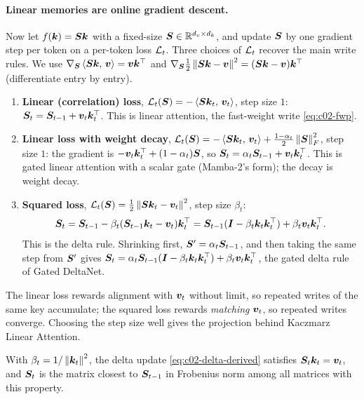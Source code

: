 \paragraph{Linear memories are online gradient descent.} Now let $f(\bm{k}) = \bm{S}\bm{k}$ with a fixed-size
$\bm{S}\in\mathbb{R}^{d_v\times d_k}$, and update $\bm{S}$ by one gradient step per token on a per-token loss
$\mathcal{L}_t$. Three choices of $\mathcal{L}_t$ recover the main write rules. We use
$\nabla_{\bm{S}}\left\langle \bm{S}\bm{k},\, \bm{v}\right\rangle = \bm{v}\bm{k}^{\top}$ and
$\nabla_{\bm{S}}\tfrac12\left\lVert \bm{S}\bm{k} - \bm{v}\right\rVert^2 = (\bm{S}\bm{k} - \bm{v})\bm{k}^{\top}$ (differentiate entry by entry).
\begin{enumerate}
  \item \textbf{Linear (correlation) loss}, $\mathcal{L}_t(\bm{S}) = -\left\langle \bm{S}\bm{k}_t,\, \bm{v}_t\right\rangle$, step size
        $1$: $\bm{S}_t = \bm{S}_{t-1} + \bm{v}_t\bm{k}_t^{\top}$. This is linear attention, the fast-weight write
        \eqref{eq:c02-fwp}.
  \item \textbf{Linear loss with weight decay}, $\mathcal{L}_t(\bm{S}) = -\left\langle \bm{S}\bm{k}_t,\, \bm{v}_t\right\rangle +
        \tfrac{1-\alpha_t}{2}\left\lVert \bm{S}\right\rVert_F^2$, step size $1$: the gradient is
        $-\bm{v}_t\bm{k}_t^{\top} + (1-\alpha_t)\bm{S}$, so $\bm{S}_t = \alpha_t\bm{S}_{t-1} + \bm{v}_t\bm{k}_t^{\top}$. This is
        gated linear attention with a scalar gate (Mamba-2's form); the decay is weight decay.
  \item \textbf{Squared loss}, $\mathcal{L}_t(\bm{S}) = \tfrac12\left\lVert \bm{S}\bm{k}_t - \bm{v}_t\right\rVert^2$, step size
        $\beta_t$:
        \begin{equation}\label{eq:c02-delta-derived}
          \bm{S}_t = \bm{S}_{t-1} - \beta_t(\bm{S}_{t-1}\bm{k}_t - \bm{v}_t)\bm{k}_t^{\top}
                = \bm{S}_{t-1}(\bm{I} - \beta_t\bm{k}_t\bm{k}_t^{\top}) + \beta_t\bm{v}_t\bm{k}_t^{\top} .
        \end{equation}
        This is the delta rule. Shrinking first, $\bm{S}' = \alpha_t\bm{S}_{t-1}$, and then taking the
        same step from $\bm{S}'$ gives
        $\bm{S}_t = \alpha_t\bm{S}_{t-1}(\bm{I} - \beta_t\bm{k}_t\bm{k}_t^{\top}) + \beta_t\bm{v}_t\bm{k}_t^{\top}$, the gated
        delta rule of Gated DeltaNet.
\end{enumerate}
The linear loss rewards alignment with $\bm{v}_t$ without limit, so repeated writes of the same key
accumulate; the squared loss rewards \emph{matching} $\bm{v}_t$, so repeated writes converge. Choosing
the step size well gives the projection behind Kaczmarz Linear Attention.

\begin{proposition}\label{prop:c02-kaczmarz}
With $\beta_t = 1/\left\lVert \bm{k}_t\right\rVert^2$, the delta update \eqref{eq:c02-delta-derived} satisfies
$\bm{S}_t\bm{k}_t = \bm{v}_t$, and $\bm{S}_t$ is the matrix closest to $\bm{S}_{t-1}$ in Frobenius norm among all
matrices with this property.
\end{proposition}

